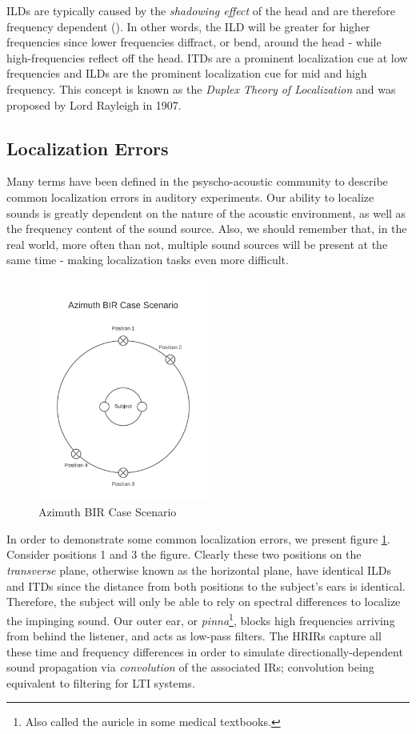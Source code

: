 ILDs are typically caused by the \textit{shadowing effect} of the head and are therefore frequency dependent (\cite{cuevas20193d}). In other words, the ILD will be greater for higher frequencies since lower frequencies diffract, or bend, around the head - while high-frequencies reflect off the head. ITDs are a prominent localization cue at low frequencies and ILDs are the prominent localization cue for mid and high frequency. This concept is known as the \textit{Duplex Theory of Localization} and was proposed by Lord Rayleigh in 1907. 

\subsection{Localization Errors}

Many terms have been defined in the psyscho-acoustic community to describe common localization errors in auditory experiments. Our ability to localize sounds is greatly dependent on the nature of the acoustic environment, as well as the frequency content of the sound source. Also, we should remember that, in the real world, more often than not, multiple sound sources will be present at the same time - making localization tasks even more difficult.

\begin{figure}[ht!]%
\centering
\includegraphics[width=0.5\textwidth]{img/azimuth-bir.png}
\caption{Azimuth BIR Case Scenario}
\label{fig:azimuth-bir}
\end{figure}

In order to demonstrate some common localization errors, we present figure \ref{fig:azimuth-bir}. Consider positions 1 and 3 the figure. Clearly these two positions on the \textit{transverse} plane, otherwise known as the horizontal plane, have identical ILDs and ITDs since the distance from both positions to the subject's ears is identical. Therefore, the subject will only be able to rely on spectral differences to localize the impinging sound. Our outer ear, or \textit{pinna}\footnote{Also called the auricle in some medical textbooks.}, blocks high frequencies arriving from behind the listener, and acts as low-pass filters. The HRIRs capture all these time and frequency differences in order to simulate directionally-dependent sound propagation via \textit{convolution} of the associated IRs; convolution being equivalent to filtering for LTI systems.

